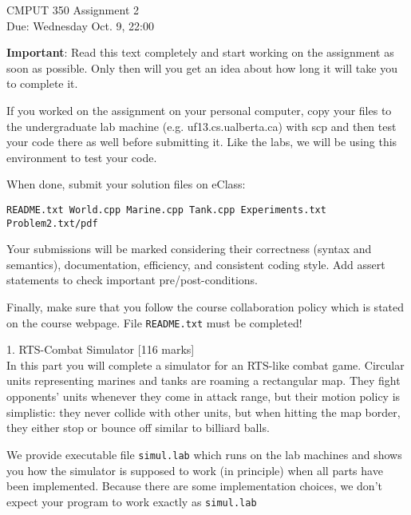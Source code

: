 \documentclass[a4paper,11pt]{article}
\begin{document}

\begin{center}
{\Large CMPUT 350 Assignment 2} \\
{Due: Wednesday Oct. 9, 22:00}
\end{center}

\linerule

\textbf{Important}:
Read this text completely and start working on the assignment as
soon as possible. Only then will you get an idea about how long it will take
you to complete it. 

\medskip

If you worked on the assignment on your personal computer, copy your files to
the undergraduate lab machine (e.g. uf13.cs.ualberta.ca) with
scp and then test your code there as well before submitting it. 
Like the labs, we will be using this environment to test your code.

\medskip

When done, submit your solution files on eClass:

\begin{center}
    \texttt{README.txt World.cpp Marine.cpp Tank.cpp Experiments.txt Problem2.txt/pdf}
\end{center}


\bigskip 

Your submissions will be marked considering their correctness (syntax and
semantics), documentation, efficiency, and consistent coding style. Add assert
statements to check important pre/post-conditions.

\medskip

Finally, make sure that you follow the course collaboration policy which is
stated on the course webpage. File \texttt{README.txt} must be completed!

\linerule

1. RTS-Combat Simulator [116 marks] \\
In this part you will complete a simulator for an RTS-like combat game.
Circular units representing marines and tanks are roaming a rectangular map.
They fight opponents' units whenever they come in attack range, but their
motion policy is simplistic: they never collide with other units, but when
hitting the map border, they either stop or bounce off similar to billiard
balls.

\bigskip

We provide executable file \texttt{simul.lab} which runs on the lab machines and shows
you how the simulator is supposed to work (in principle) when all parts have
been implemented. Because there are some implementation choices, we don't
expect your program to work exactly as \texttt{simul.lab}
\end{document}

